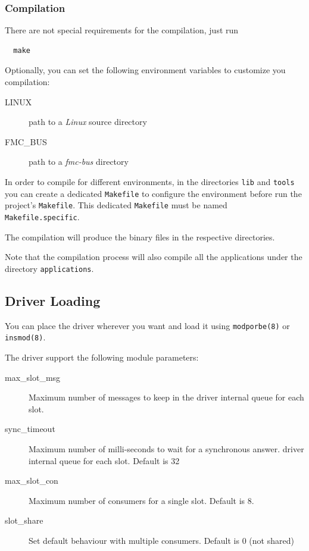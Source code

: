 \documentclass[a4paper,10pt]{article}
\begin{document}
\subsubsection{Compilation}%
There are not special requirements for the compilation, just run

\begin{verbatim}
  make
\end{verbatim}

Optionally, you can set the following environment variables to
customize you compilation:
\begin{description}
  \item[LINUX] path to a \textit{Linux} source directory
  \item[FMC\_BUS] path to a \textit{fmc-bus} directory
\end{description}

In order to compile for different environments, in the directories
\texttt{lib} and \texttt{tools} you can create a dedicated
\texttt{Makefile} to configure the environment before run the
project's \texttt{Makefile}. This dedicated \texttt{Makefile} must be
named \texttt{Makefile.specific}.

The compilation will produce the binary files in the respective
directories.

Note that the compilation process will also compile all the
applications under the directory \texttt{applications}.

\subsection{Driver Loading}%
You can place the driver wherever you want and load it using
\texttt{modporbe(8)} or \texttt{insmod(8)}.

The driver support the following module parameters:
\begin{description}
  \item[max\_slot\_msg] Maximum number of messages to keep in the
    driver internal queue for each slot.
  \item[sync\_timeout] Maximum number of milli-seconds to wait for a
    synchronous answer.
 driver internal queue for each slot. Default is 32
  \item[max\_slot\_con] Maximum number of consumers for a single slot.
Default is 8.
  \item[slot\_share] Set default behaviour with multiple consumers.
Default is 0 (not shared)
\end{description}
\end{document}
